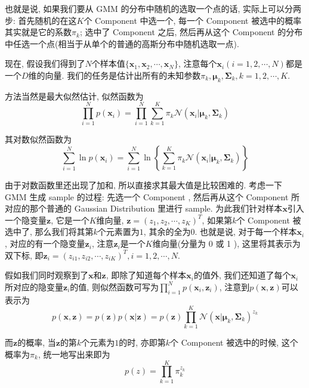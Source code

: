\documentclass[a4paper,UTF8]{ctexart}
\theoremstyle{plain} \newtheorem{theorem}{定理}[section]
\theoremstyle{plain} \newtheorem{definition}{定义}[section]
\theoremstyle{plain} \newtheorem{lemma}{引理}[section]
\theoremstyle{plain} \newtheorem{proposition}{命题}[section]
\theoremstyle{plain} \newtheorem{example}{例}
\theoremstyle{plain} \newtheorem{remark}{注}
\theoremstyle{plain} \newtheorem{corollary}{推论}[section]
\begin{document}
也就是说, 如果我们要从 GMM 的分布中随机的选取一个点的话, 实际上可以分两步: 首先随机的在这$K$个 Component 中选一个, 每一个 Component 被选中的概率其实就是它的系数$\pi_{k}$; 选中了 Component 之后, 然后再从这个 Component 的分布中任选一个点(相当于从单个的普通的高斯分布中随机选取一点).

现在, 假设我们得到了$N$个样本值$\{ \bm{x}_{1}, \bm{x}_{2}, \cdots, \bm{x}_{N} \}$, 注意每个$\bm{x}_{i}(i = 1, 2, \cdots, N)$都是一个$D$维的向量. 我们的任务是估计出所有的未知参数$\pi_{k},\bm{\mu}_{k},\bm{\Sigma}_{k}, k = 1,2,\cdots,K$.

方法当然是最大似然估计, 似然函数为
\begin{equation*}
\prod_{i=1}^{N} p(\bm{x}_{i}) = \prod_{i=1}^{N} \sum_{k=1}^{K} \pi_{k} \mathcal{N}(\bm{x}_{i}| \bm{\mu}_{k}, \bm{\Sigma}_{k})
\end{equation*}

其对数似然函数为
\begin{equation*}
\sum_{i=1}^{N} \ln p(\bm{x}_{i}) = \sum_{i=1}^{N} \ln \left\{ \sum_{k=1}^{K} \pi_{k} \mathcal{N}(\bm{x}_{i} | \bm{\mu}_{k}, \bm{\Sigma}_{k}) \right\}
\end{equation*}

由于对数函数里还出现了加和, 所以直接求其最大值是比较困难的. 考虑一下 GMM 生成 sample 的过程: 先选一个 Component , 然后再从这个 Component 所对应的那个普通的 Gaussian Distribution 里进行 sample. 为此我们针对样本$\bm{x}$引入一个隐变量$\bm{z}$, 它是一个$K$维向量, $\bm{z}=(z_{1},z_{2},\cdots,z_{K})^{T}$, 如果第$k$个 Component 被选中了, 那么我们将其第$k$个元素置为$1$, 其余的全为$0$. 也就是说, 对于每一个样本$\bm{x}_{i}$, 对应的有一个隐变量$\bm{z}_{i}$, 注意$\bm{z}_{i}$是一个$K$维向量(分量为 0 或 1 ), 这里将其表示为双下标, 即$\bm{z}_{i} = (z_{i1}, z_{i2}, \cdots, z_{iK})^{T}, i = 1, 2, \cdots, N$.

假如我们同时观察到了$\bm{x}$和$\bm{z}$, 即除了知道每个样本$\bm{x}_{i}$的值外, 我们还知道了每个$\bm{x}_{i}$所对应的隐变量$\bm{z}_{i}$的值, 则似然函数可写为$\prod\limits_{i=1}^{N} p(\bm{x}_{i}, \bm{z}_{i})$, 注意到$p(\bm{x}, \bm{z})$可以表示为
\begin{equation*}
p(\bm{x}, \bm{z}) = p(\bm{z}) p(\bm{x} | \bm{z}) = p(\bm{z}) \prod_{k=1}^{K} \mathcal{N} (\bm{x} | \bm{\mu}_{k}, \bm{\Sigma}_{k})^{z_{k}}
\end{equation*}

而$\bm{z}$的概率, 当$\bm{z}$的第$k$个元素为$1$的时, 亦即第$k$个 Component 被选中的时候, 这个概率为$\pi_{k}$, 统一地写出来即为
\begin{equation*}
p(z) = \prod_{k=1}^{K} \pi_{k}^{z_{k}}
\end{equation*}
\end{document}
